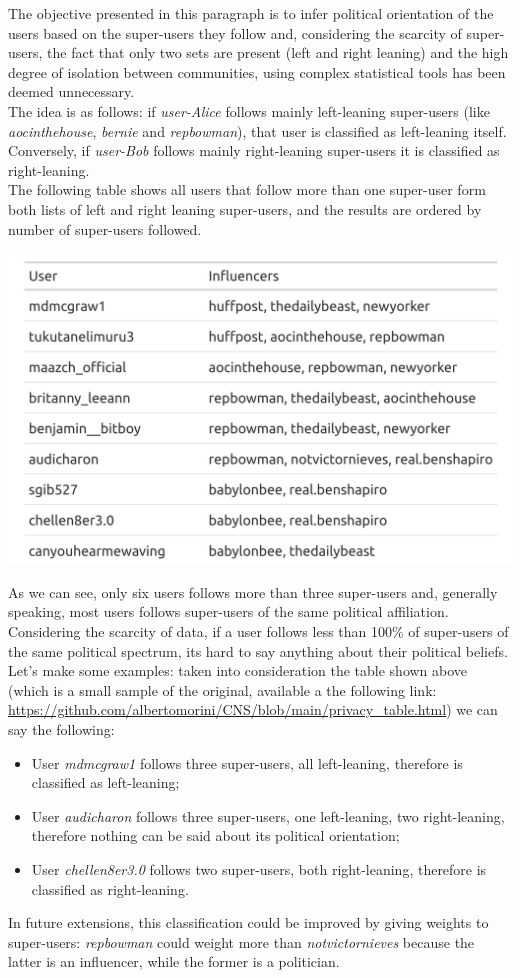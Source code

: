 The objective presented in this paragraph is to infer political orientation of the users based on the super-users they follow and, considering the scarcity of super-users, the fact that only two sets are present (left and right leaning) and the high degree of isolation between communities, using complex statistical tools has been deemed unnecessary.\\
The idea is as follows: if \textit{user-Alice} follows mainly left-leaning super-users (like \textit{aocinthehouse}, \textit{bernie} and \textit{repbowman}), that user is classified as left-leaning itself. Conversely, if \textit{user-Bob} follows mainly right-leaning super-users it is classified as right-leaning.\\
The following table shows all users that follow more than one super-user form both lists of left and right leaning super-users, and the results are ordered by number of super-users followed.

\aCapo{}
\includegraphics[width = .5\textwidth]{images/final_privacy_table.png}

As we can see, only six users follows more than three super-users and, generally speaking, most users follows super-users of the same political affiliation. Considering the scarcity of data, if a user follows less than 100\% of super-users of the same political spectrum, its hard to say anything about their political beliefs.\\
Let's make some examples: taken into consideration the table shown above (which is a small sample of the original, available a the following link: \url{https://github.com/albertomorini/CNS/blob/main/privacy\_table.html}) we can say the following:

\begin{itemize}
    \item User \textit{mdmcgraw1} follows three super-users, all left-leaning, therefore is classified as left-leaning;
    \item User \textit{audicharon} follows three super-users, one left-leaning, two right-leaning, therefore nothing can be said about its political orientation;
    \item User \textit{chellen8er3.0} follows two super-users, both right-leaning, therefore is classified as right-leaning.
\end{itemize}

In future extensions, this classification could be improved by giving weights to super-users: \textit{repbowman} could weight more than \textit{notvictornieves} because the latter is an influencer, while the former is a politician.